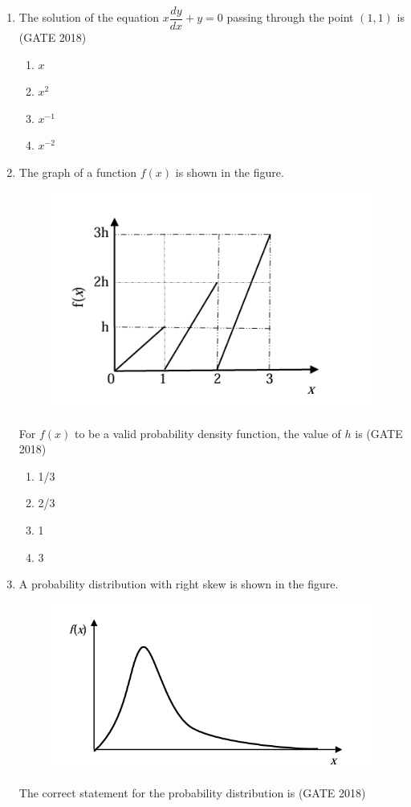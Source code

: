 \documentclass[journal,12pt,onecolumn]{IEEEtran}
\theoremstyle{remark}
\begin{document}
\begin{enumerate}

\vspace{1cm}
\item The solution of the equation $x \dfrac{dy}{dx} + y = 0$ passing through the point $(1,1)$ is
\hfill{(GATE 2018)}

\begin{enumerate}
    \item $x$
    \item $x^2$
    \item $x^{-1}$
    \item $x^{-2}$
\end{enumerate}

\vspace{1cm}

\item The graph of a function $f(x)$ is shown in the figure.
\begin{figure}[h]
    \centering
    \includegraphics[width=0.5\linewidth]{GATE-CE-2018/2-2.png}
    \caption{}
    \label{2-2}
\end{figure}
For $f(x)$ to be a valid probability density function, the value of $h$ is
\hfill{(GATE 2018)}
\begin{multicols}{4}
\begin{enumerate}
    \item 1/3
    \item 2/3
    \item 1
    \item 3
\end{enumerate}
\end{multicols}
\vspace{1cm}

\item A probability distribution with right skew is shown in the figure.
\begin{figure}
    \centering
    \includegraphics[width=0.5\linewidth]{GATE-CE-2018/3-2.png}
    \caption{}
    \label{3-2}
\end{figure}
The correct statement for the probability distribution is
\hfill{(GATE 2018)}


\end{enumerate}
\end{document}
